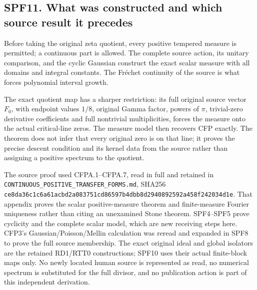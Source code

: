 \subsection{SPF11. What was constructed and which source result it
precedes}\label{spf11.-what-was-constructed-and-which-source-result-it-precedes}

Before taking the original zeta quotient, every positive tempered
measure is permitted; a continuous part is allowed. The complete source
action, its unitary comparison, and the cyclic Gaussian construct the
exact scalar measure with all domains and integral constants. The
Fréchet continuity of the source is what forces polynomial interval
growth.

The exact quotient map has a sharper restriction: its full original
source vector \(F_0\), with endpoint values \(1/8\), original Gamma
factor, powers of \(\pi\), trivial-zero derivative coefficients and full
nontrivial multiplicities, forces the measure onto the actual
critical-line zeros. The measure model then recovers CFP exactly. The
theorem does not infer that every original zero is on that line; it
proves the precise descent condition and its kernel data from the source
rather than assigning a positive spectrum to the quotient.

The source proof used CFPA.1--CFPA.7, read in full and retained in
\nolinkurl{CONTINUOUS_POSITIVE_TRANSFER_FORMS.md}, SHA256
\nolinkurl{ce8da36c1c6a61acbd2a083751cd86597b4dbb8d2940892592a458f242034d1e}.
That appendix proves the scalar positive-measure theorem and
finite-measure Fourier uniqueness rather than citing an unexamined Stone
theorem. SPF4--SPF5 prove cyclicity and the complete scalar model, which
are new receiving steps here. CFP3's Gaussian/Poisson/Mellin calculation
was reread and expanded in SPF8 to prove the full source membership. The
exact original ideal and global isolators are the retained RD1/RTT0
constructions; SPF10 uses their actual finite-block maps only. No newly
located human source is represented as read, no numerical spectrum is
substituted for the full divisor, and no publication action is part of
this independent derivation.
